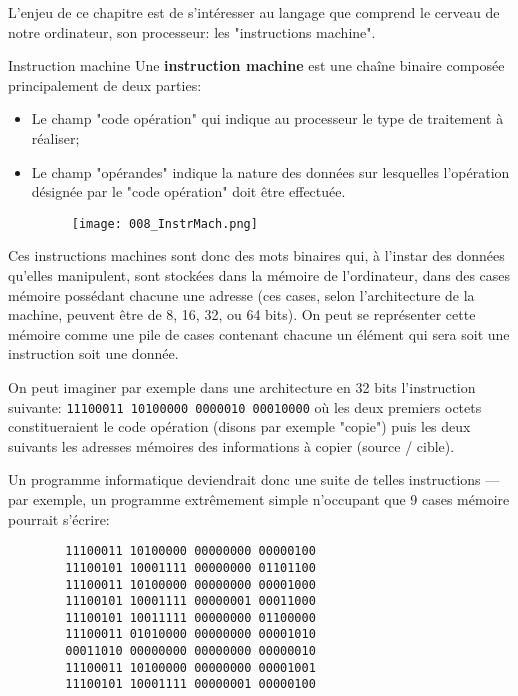 \documentclass[12pt]{article}
\begin{document}
	 	 
	 L'enjeu de ce chapitre est de s'intéresser au langage que comprend le cerveau de notre ordinateur, son processeur: les "instructions machine".
	 
	 \begin{MaDef}{Instruction machine}
	 	Une \textbf{instruction machine} est une chaîne binaire composée principalement de deux parties:
	 	\begin{itemize}
	 		\item Le champ "code opération" qui indique au processeur le type de traitement à réaliser;
	 		\item Le champ "opérandes" indique la nature des données sur lesquelles l'opération désignée par le "code opération" doit être effectuée.
	 		
	 		\begin{figure}[H]
	 			\centering
	 			\texttt{[image: 008\_InstrMach.png]}
	 		\end{figure}
	 	\end{itemize}
	 \end{MaDef}
	 
	 Ces instructions machines sont donc des mots binaires qui, à l'instar des données qu'elles manipulent, sont stockées dans la mémoire de l'ordinateur, dans des cases mémoire possédant chacune une adresse (ces cases, selon l'architecture de la machine, peuvent être de 8, 16, 32, ou 64 bits). On peut se représenter cette mémoire comme une pile de cases contenant chacune un élément qui sera soit une instruction soit une donnée. 
	
	On peut imaginer par exemple dans une architecture en 32 bits l'instruction suivante: \texttt{11100011 10100000 0000010 00010000} où les deux premiers octets constitueraient le code opération (disons par exemple "copie") puis les deux suivants les adresses mémoires des informations à copier (source / cible).
	
	Un programme informatique deviendrait donc une suite de telles instructions --- par exemple, un programme extrêmement simple n'occupant que 9 cases mémoire pourrait s'écrire:
	
	\begin{Verbatim}
		11100011 10100000 00000000 00000100
		11100101 10001111 00000000 01101100
		11100011 10100000 00000000 00001000
		11100101 10001111 00000001 00011000
		11100101 10011111 00000000 01100000
		11100011 01010000 00000000 00001010
		00011010 00000000 00000000 00000010
		11100011 10100000 00000000 00001001
		11100101 10001111 00000001 00000100
	\end{Verbatim}
	 
\end{document}
